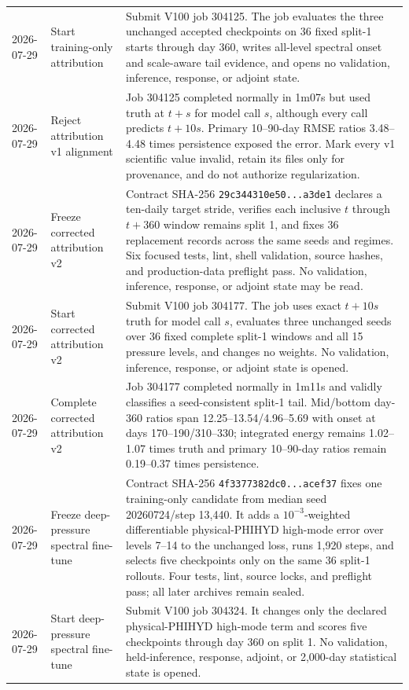 \documentclass[11pt]{article}
\begin{document}
\begin{longtable}{@{}p{}p{}p{}@{}}
2026-07-29 & Start training-only attribution & Submit V100 job 304125.  The job evaluates the three unchanged accepted checkpoints on 36 fixed split-1 starts through day 360, writes all-level spectral onset and scale-aware tail evidence, and opens no validation, inference, response, or adjoint state. \\
2026-07-29 & Reject attribution v1 alignment & Job 304125 completed normally in 1m07s but used truth at \(t+s\) for model call \(s\), although every call predicts \(t+10s\).  Primary 10--90-day RMSE ratios 3.48--4.48 times persistence exposed the error.  Mark every v1 scientific value invalid, retain its files only for provenance, and do not authorize regularization. \\
2026-07-29 & Freeze corrected attribution v2 & Contract SHA-256 \texttt{29c344310e50...a3de1} declares a ten-daily target stride, verifies each inclusive \(t\) through \(t+360\) window remains split 1, and fixes 36 replacement records across the same seeds and regimes.  Six focused tests, lint, shell validation, source hashes, and production-data preflight pass.  No validation, inference, response, or adjoint state may be read. \\
2026-07-29 & Start corrected attribution v2 & Submit V100 job 304177.  The job uses exact \(t+10s\) truth for model call \(s\), evaluates three unchanged seeds over 36 fixed complete split-1 windows and all 15 pressure levels, and changes no weights.  No validation, inference, response, or adjoint state is opened. \\
2026-07-29 & Complete corrected attribution v2 & Job 304177 completed normally in 1m11s and validly classifies a seed-consistent split-1 tail.  Mid/bottom day-360 ratios span 12.25--13.54/4.96--5.69 with onset at days 170--190/310--330; integrated energy remains 1.02--1.07 times truth and primary 10--90-day ratios remain 0.19--0.37 times persistence. \\
2026-07-29 & Freeze deep-pressure spectral fine-tune & Contract SHA-256 \texttt{4f3377382dc0...acef37} fixes one training-only candidate from median seed 20260724/step 13,440.  It adds a \(10^{-3}\)-weighted differentiable physical-PHIHYD high-mode error over levels 7--14 to the unchanged loss, runs 1,920 steps, and selects five checkpoints only on the same 36 split-1 rollouts.  Four tests, lint, source locks, and preflight pass; all later archives remain sealed. \\
2026-07-29 & Start deep-pressure spectral fine-tune & Submit V100 job 304324.  It changes only the declared physical-PHIHYD high-mode term and scores five checkpoints through day 360 on split 1.  No validation, held-inference, response, adjoint, or 2,000-day statistical state is opened. \\

\end{longtable}
\end{document}
